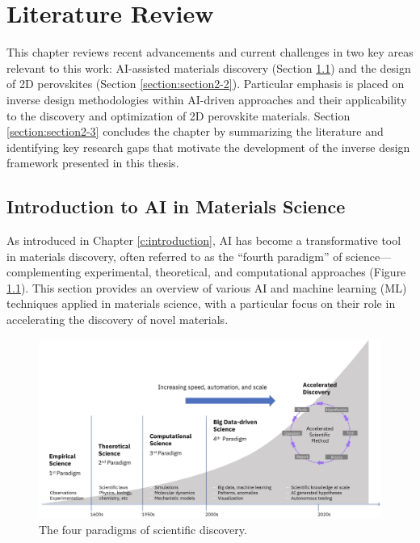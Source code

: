 \chapter{Literature Review}\label{c:literature}

This chapter reviews recent advancements and current challenges in two key areas relevant to this work: AI-assisted materials discovery (Section \ref{section:section2-1}) and the design of 2D perovskites (Section \ref{section:section2-2}). Particular emphasis is placed on inverse design methodologies within AI-driven approaches and their applicability to the discovery and optimization of 2D perovskite materials. Section \ref{section:section2-3} concludes the chapter by summarizing the literature and identifying key research gaps that motivate the development of the inverse design framework presented in this thesis.

\section{Introduction to AI in Materials Science}\label{section:section2-1}

As introduced in Chapter \ref{c:introduction}, AI has become a transformative tool in materials discovery, often referred to as the “fourth paradigm” of science—complementing experimental, theoretical, and computational approaches (Figure \ref{fig:figure2.1}). This section provides an overview of various AI and machine learning (ML) techniques applied in materials science, with a particular focus on their role in accelerating the discovery of novel materials.


\begin{figure}[ht]
    \centering
    \includegraphics[width=\textwidth]{figures/literature-review/figure2-1.png}
    \caption{The four paradigms of scientific discovery\cite{RN448}.}
    \label{fig:figure2.1}
\end{figure}

